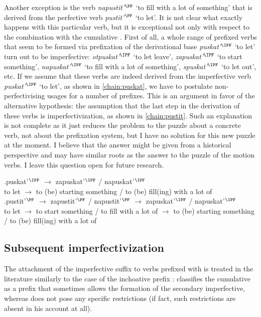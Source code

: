 Another exception is the verb \textit{napustit'}$^{\PF}$ `to fill with a lot of something' that is derived from the perfective verb \textit{pustit'}$^{\PF}$ `to let'. It is not clear what exactly happens with this particular verb, but it is exceptional not only with respect to the combination with the cumulative . First of all, a whole range of prefixed verbs that seem to be formed via prefixation of the derivational base \textit{puskat'}$^{\IPF}$ `to let' turn out to be imperfective: \textit{otpuskat'}$^{\IPF}$ `to let leave', \textit{zapuskat'}$^{\IPF}$ `to start something', \textit{napuskat'}$^{\IPF}$ `to fill with a lot of something', \textit{spuskat'}$^{\IPF}$ `to let out', etc. If we assume that these verbs are indeed derived from the imperfective verb \textit{puskat'}$^{\IPF}$ `to let', as shown in \ref{chain:puskat}, we have to postulate non-perfectivising usages for a number of prefixes. This is an argument in favor of the alternative hypothesis: the assumption that the last step in the derivation of these verbs is imperfectivization, as shown in \ref{chain:pustit}. Such an explanation is not complete as it just reduces the problem to the puzzle about a concrete verb, not about the prefixation system, but I have no solution for this new puzzle at the moment. I believe that the answer might be given from a historical perspective and may have similar roots as the answer to the puzzle of the motion verbs. I leave this question open for future research.

\exg.puskat'$^{\IPF}$ $\rightarrow$ zapuskat'$^{\IPF}$ / napuskat'$^{\IPF}$ \label{chain:puskat}\\
{to let} $\rightarrow$ {to (be) starting something} / {to (be) fill(ing) with a lot of}\\

\exg.pustit'$^{\PF}$ $\rightarrow$ zapustit'$^{\PF}$ / napustit'$^{\PF}$ $\rightarrow$ zapuskat'$^{\IPF}$ / napuskat'$^{\IPF}$ \label{chain:pustit}\\
{to let} $\rightarrow$ {to start something} / {to fill with a lot of} $\rightarrow$ {to (be) starting something} / {to (be) fill(ing) with a lot of}\\

\subsection{Subsequent imperfectivization}
The attachment of the imperfective suffix to verbs prefixed with  is treated in the literature similarly to the case of the inchoative prefix : \citet[230]{Svenonius:04b} classifies the cumulative  as a prefix that sometimes allows the formation of the secondary imperfective, whereas \citet{Tatevosov:09} does not pose any specific restrictions (if fact, such restrictions are absent in his account at all).

